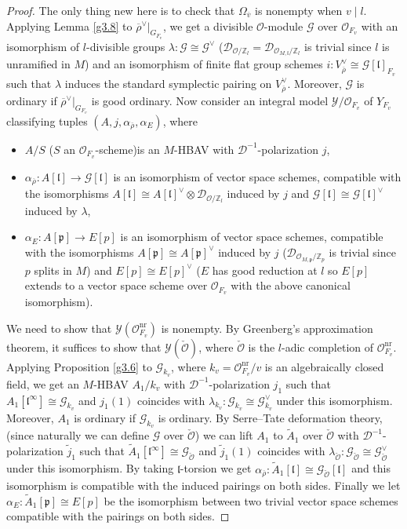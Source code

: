 \documentclass[10pt]{article}
\theoremstyle{definition}
\numberwithin{equation}{theorem}
\newcommand{\ZZ}{\mathbb{Z}}
\newcommand{\calD}{\mathcal{D}}
\newcommand{\calG}{\mathcal{G}}
\newcommand{\calO}{\mathcal{O}}
\newcommand{\calY}{\mathcal{Y}}
\newcommand{\gothl}{\mathfrak{l}}
\newcommand{\gothp}{\mathfrak{p}}
\begin{document}
\begin{proof}
The only thing new here is to check that $\Omega_{\overline{v}}$ is nonempty when $v\mid l$. Applying Lemma \ref{g3.8} to $\overline{\rho}^\vee|_{G_{F_v}}$, we get a divisible $\calO$-module $\calG$ over $\calO_{F_v}$ with an isomorphism of $l$-divisible groups $\lambda:\calG\cong\calG^\vee$ ($\calD_{\calO/\ZZ_l}=\calD_{\calO_{M,\gothl}/\ZZ_l}$ is trivial since $l$ is unramified in $M$) and an isomorphism of finite flat group schemes $i:V_{\overline{\rho}}^\vee\cong\calG[\gothl]_{F_v}$ such that $\lambda$ induces the standard symplectic pairing on $V_{\overline{\rho}}^\vee$. Moreover, $\calG$ is ordinary if $\overline{\rho}^\vee|_{G_{F_v}}$ is good ordinary. Now consider an integral model $\calY/\calO_{F_v}$ of $Y_{F_v}$ classifying tuples $(A,j,\alpha_{\overline{\rho}},\alpha_E)$, where 
\begin{itemize}
    \item $A/S$ ($S$ an $\calO_{F_v}$-scheme)is an $M$-HBAV with $\calD^{-1}$-polarization $j$,
    \item $\alpha_{\overline{\rho}}:A[\gothl]\to\calG[\gothl]$ is an isomorphism of vector space schemes, compatible with the isomorphisms $A[\gothl]\cong A[\gothl]^\vee\otimes\calD_{\calO/\ZZ_l}$ induced by $j$ and $\calG[\gothl]\cong\calG[\gothl]^\vee$ induced by $\lambda$,
    \item $\alpha_E:A[\gothp]\to E[p]$ is an isomorphism of vector space schemes, compatible with the isomorphisms $A[\gothp]\cong A[\gothp]^\vee$ induced by $j$ ($\calD_{\calO_{M,\gothp}/\ZZ_p}$ is trivial since $p$ splits in $M$) and $E[p]\cong E[p]^\vee$ ($E$ has good reduction at $l$ so $E[p]$ extends to a vector space scheme over $\calO_{F_v}$ with the above canonical isomorphism).
\end{itemize}
We need to show that $\calY(\calO_{F_v}^\text{nr})$ is nonempty. By Greenberg's approximation theorem, it suffices to show that $\calY(\check{\calO})$, where $\check{\calO}$ is the $l$-adic completion of $\calO_{F_v}^\text{nr}$. Applying Proposition \ref{g3.6} to $\calG_{k_v}$, where $k_v=\calO_{F_v}^\text{nr}/v$ is an algebraically closed field, we get an $M$-HBAV $A_1/k_v$ with $\calD^{-1}$-polarization $j_1$ such that $A_1[\gothl^\infty]\cong\calG_{k_v}$ and $j_1(1)$ coincides with $\lambda_{k_v}:\calG_{k_v}\cong\calG_{k_v}^\vee$ under this isomorphism. Moreover, $A_1$ is ordinary if $\calG_{k_v}$ is ordinary. By Serre--Tate deformation theory, (since naturally we can define $\calG$ over $\check{\calO}$) we can lift $A_1$ to $\widetilde{A}_1$ over $\check{\calO}$ with $\calD^{-1}$-polarization $\widetilde{j}_1$ such that $\widetilde{A}_1[\gothl^\infty]\cong\calG_{\check{\calO}}$ and $\widetilde{j}_1(1)$ coincides with $\lambda_{\check{\calO}}:\calG_{\check{\calO}}\cong\calG_{\check{\calO}}^\vee$ under this isomorphism. By taking $\gothl$-torsion we get $\alpha_{\overline{\rho}}: \widetilde{A}_1[\gothl]\cong\calG_{\check{\calO}}[\gothl]$ and this isomorphism is compatible with the induced pairings on both sides. Finally we let $\alpha_E:\widetilde{A}_1[\gothp]\cong E[p]$ be the isomorphism between two trivial vector space schemes compatible with the pairings on both sides.


\end{proof}
\end{document}
